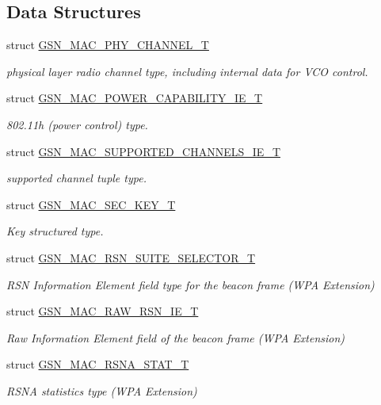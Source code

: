 \subsection*{Data Structures}
\begin{DoxyCompactItemize}
\item 
struct \hyperlink{a00118}{GSN\_\-MAC\_\-PHY\_\-CHANNEL\_\-T}
\begin{DoxyCompactList}\small\item\em physical layer radio channel type, including internal data for VCO control. \end{DoxyCompactList}\item 
struct \hyperlink{a00122}{GSN\_\-MAC\_\-POWER\_\-CAPABILITY\_\-IE\_\-T}
\begin{DoxyCompactList}\small\item\em 802.11h (power control) type. \end{DoxyCompactList}\item 
struct \hyperlink{a00133}{GSN\_\-MAC\_\-SUPPORTED\_\-CHANNELS\_\-IE\_\-T}
\begin{DoxyCompactList}\small\item\em supported channel tuple type. \end{DoxyCompactList}\item 
struct \hyperlink{a00131}{GSN\_\-MAC\_\-SEC\_\-KEY\_\-T}
\begin{DoxyCompactList}\small\item\em Key structured type. \end{DoxyCompactList}\item 
struct \hyperlink{a00128}{GSN\_\-MAC\_\-RSN\_\-SUITE\_\-SELECTOR\_\-T}
\begin{DoxyCompactList}\small\item\em RSN Information Element field type for the beacon frame (WPA Extension) \end{DoxyCompactList}\item 
struct \hyperlink{a00126}{GSN\_\-MAC\_\-RAW\_\-RSN\_\-IE\_\-T}
\begin{DoxyCompactList}\small\item\em Raw Information Element field of the beacon frame (WPA Extension) \end{DoxyCompactList}\item 
struct \hyperlink{a00129}{GSN\_\-MAC\_\-RSNA\_\-STAT\_\-T}
\begin{DoxyCompactList}\small\item\em RSNA statistics type (WPA Extension) \end{DoxyCompactList}\item 

\end{DoxyCompactItemize}
